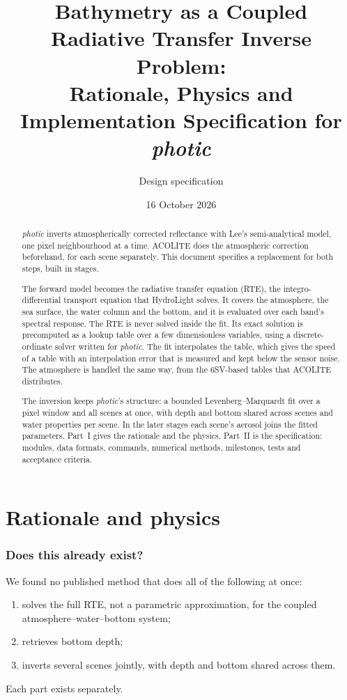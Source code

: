 \documentclass[11pt]{article}
\title{Bathymetry as a Coupled Radiative Transfer Inverse Problem:\\
Rationale, Physics and Implementation Specification for \textit{photic}}
\author{Design specification}
\date{16 October 2026}
\numberwithin{equation}{section}
\begin{document}
\maketitle

\begin{abstract}
\textit{photic} inverts atmospherically corrected reflectance with Lee's semi-analytical
model, one pixel neighbourhood at a time. ACOLITE does the atmospheric correction beforehand,
for each scene separately. This document specifies a replacement for both steps, built in
stages.

The forward model becomes the radiative transfer equation (RTE), the integro-differential
transport equation that HydroLight solves. It covers the atmosphere, the sea surface, the water
column and the bottom, and it is evaluated over each band's spectral response. The RTE is never
solved inside the fit. Its exact solution is precomputed as a lookup table over a few
dimensionless variables, using a discrete-ordinate solver written for \textit{photic}. The fit
interpolates the table, which gives the speed of a table with an interpolation error that is
measured and kept below the sensor noise. The atmosphere is handled the same way, from the
6SV-based tables that ACOLITE distributes.

The inversion keeps \textit{photic}'s structure: a bounded Levenberg--Marquardt fit over a pixel
window and all scenes at once, with depth and bottom shared across scenes and water properties
per scene. In the later stages each scene's aerosol joins the fitted parameters. Part~I gives
the rationale and the physics. Part~II is the specification: modules, data formats, commands,
numerical methods, milestones, tests and acceptance criteria.
\end{abstract}

\tableofcontents

\part{Rationale and physics}

\section{Does this already exist?}\label{sec:prior}

We found no published method that does all of the following at once:
\begin{enumerate}
\item solves the full RTE, not a parametric approximation, for the coupled
atmosphere--water--bottom system;
\item retrieves bottom depth;
\item inverts several scenes jointly, with depth and bottom shared across them.
\end{enumerate}
Each part exists separately.
\end{document}
